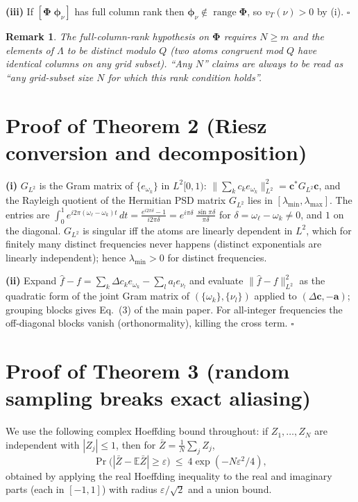 \documentclass[10pt]{article}
\newtheorem{remark}{Remark}
\DeclareMathOperator{\range}{range}
\newcommand{\Lam}{\Lambda}
\newcommand{\Phimat}{\bm{\Phi}}
\newcommand{\norm}[1]{\lVert#1\rVert}
\newcommand{\vt}{v_T}
\begin{document}
\textbf{(iii)}  If $[\Phimat\;\bm\phi_\nu]$ has full column rank then
$\bm\phi_\nu\notin\range\Phimat$, so $\vt(\nu)>0$ by (i). \hfill$\square$

\begin{remark}
The full-column-rank hypothesis on $\Phimat$ requires $N\ge m$ and the elements of
$\Lam$ to be distinct modulo $Q$ (two atoms congruent mod $Q$ have identical columns on
any grid subset).  ``Any $N$'' claims are always to be read as ``any grid-subset size
$N$ for which this rank condition holds''.
\end{remark}

\section{Proof of Theorem 2 (Riesz conversion and decomposition)}

\textbf{(i)}  $G_{L^2}$ is the Gram matrix of $\{e_{\omega_k}\}$ in $L^2[0,1)$:
$\norm{\sum_kc_ke_{\omega_k}}_{L^2}^2=\bm c^{*}G_{L^2}\bm c$, and the Rayleigh quotient
of the Hermitian PSD matrix $G_{L^2}$ lies in
$[\lambda_{\min},\lambda_{\max}]$.  The entries are
$\int_0^1e^{i2\pi(\omega_\ell-\omega_k)t}\,dt
=\frac{e^{i2\pi\delta}-1}{i2\pi\delta}=e^{i\pi\delta}\,\frac{\sin\pi\delta}{\pi\delta}$
for $\delta=\omega_\ell-\omega_k\neq0$, and $1$ on the diagonal.  $G_{L^2}$ is singular
iff the atoms are linearly dependent in $L^2$, which for finitely many distinct
frequencies never happens (distinct exponentials are linearly independent); hence
$\lambda_{\min}>0$ for distinct frequencies.

\textbf{(ii)}  Expand
$\hat f-f=\sum_k\Delta c_k e_{\omega_k}-\sum_l a_le_{\nu_l}$ and evaluate
$\norm{\hat f-f}_{L^2}^2$ as the quadratic form of the joint Gram matrix of
$(\{\omega_k\},\{\nu_l\})$ applied to $(\Delta\bm c,-\bm a)$; grouping blocks gives
Eq.~(3) of the main paper.  For all-integer frequencies the off-diagonal blocks vanish
(orthonormality), killing the cross term. \hfill$\square$

\section{Proof of Theorem 3 (random sampling breaks exact aliasing)}

We use the following complex Hoeffding bound throughout: if $Z_1,\dots,Z_N$ are
independent with $|Z_j|\le1$, then for $\bar Z=\frac1N\sum_jZ_j$,
\begin{equation}\label{eq:hoeffding}
\Pr\big(|\bar Z-\mathbb E\bar Z|\ge\varepsilon\big)\ \le\
4\exp(-N\varepsilon^2/4),
\end{equation}
obtained by applying the real Hoeffding inequality to the real and imaginary parts
(each in $[-1,1]$) with radius $\varepsilon/\sqrt2$ and a union bound.
\end{document}
